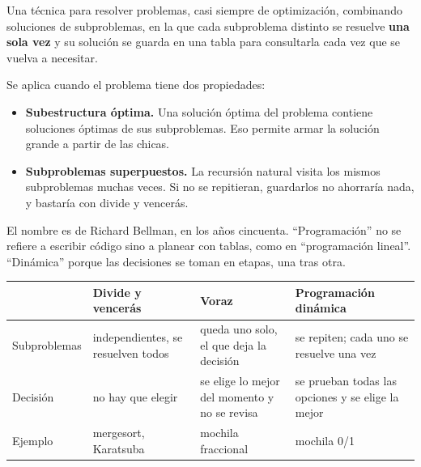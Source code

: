 \documentclass[11pt,letterpaper]{article}
\begin{document}
\begin{definicion}
  Una técnica para resolver problemas, casi siempre de optimización,
  combinando soluciones de subproblemas, en la que cada subproblema
  distinto se resuelve \textbf{una sola vez} y su solución se guarda
  en una tabla para consultarla cada vez que se vuelva a necesitar.
\end{definicion}

Se aplica cuando el problema tiene dos propiedades:

\begin{itemize}[itemsep=0.3em]
  \item \textbf{Subestructura óptima.} Una solución óptima del
        problema contiene soluciones óptimas de sus subproblemas. Eso
        permite armar la solución grande a partir de las chicas.
  \item \textbf{Subproblemas superpuestos.} La recursión natural
        visita los mismos subproblemas muchas veces. Si no se
        repitieran, guardarlos no ahorraría nada, y bastaría con
        divide y vencerás.
\end{itemize}

\begin{observacion}
  El nombre es de Richard Bellman, en los años cincuenta.
  ``Programación'' no se refiere a escribir código sino a planear con
  tablas, como en ``programación lineal''. ``Dinámica'' porque las
  decisiones se toman en etapas, una tras otra.
\end{observacion}

\begin{center}
\small
\begin{tabular}{l>{\raggedright\arraybackslash}p{3.6cm}%
                 >{\raggedright\arraybackslash}p{3.8cm}%
                 >{\raggedright\arraybackslash}p{3.4cm}}
  \toprule
  & \textbf{Divide y vencerás} & \textbf{Voraz}
    & \textbf{Programación dinámica} \\
  \midrule
  Subproblemas & independientes, se resuelven todos
               & queda uno solo, el que deja la decisión
               & se repiten; cada uno se resuelve una vez \\
  \addlinespace
  Decisión & no hay que elegir
           & se elige lo mejor del momento y no se revisa
           & se prueban todas las opciones y se elige la mejor \\
  \addlinespace
  Ejemplo & mergesort, Karatsuba & mochila fraccional
          & mochila 0/1 \\
  \bottomrule
\end{tabular}
\end{center}
\end{document}
